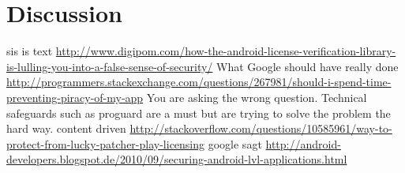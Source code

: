 \section{Discussion}\label{section:conclusion-discussion}
sis is text
\url{http://www.digipom.com/how-the-android-license-verification-library-is-lulling-you-into-a-false-sense-of-security/} What Google should have really done
\newline
\url{http://programmers.stackexchange.com/questions/267981/should-i-spend-time-preventing-piracy-of-my-app} You are asking the wrong question. Technical safeguards such as proguard are a must but are trying to solve the problem the hard way.\newline
content driven \url{http://stackoverflow.com/questions/10585961/way-to-protect-from-lucky-patcher-play-licensing}\newline
google sagt \url{http://android-developers.blogspot.de/2010/09/securing-android-lvl-applications.html}\newline
